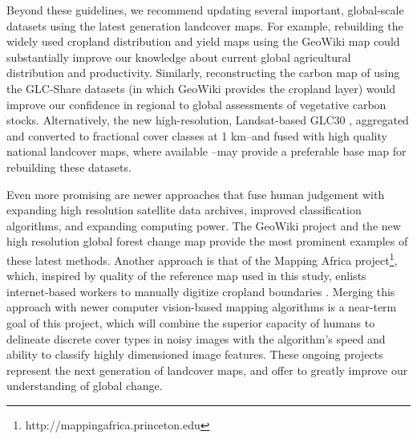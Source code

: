 \documentclass{pnastwo}
\begin{document}
\begin{article}
Beyond these guidelines, we recommend updating several important, global-scale datasets using the latest generation landcover maps. For example, rebuilding the widely used cropland distribution and yield maps \cite{monfreda_farming_2008, ramankutty_farming_2008} using the GeoWiki map could substantially improve our knowledge about current global agricultural distribution and productivity. Similarly, reconstructing the carbon map of \cite{ruesch_new_2008} using the GLC-Share datasets (in which GeoWiki provides the cropland layer) would improve our confidence in regional to global assessments of vegetative carbon stocks. Alternatively, the new high-resolution, Landsat-based GLC30 \cite{chen_global_2015}, aggregated and converted to fractional cover classes at 1 km--and fused with high quality national landcover maps, where available \cite[similar to][]{fritz_mapping_2015,fritz_cropland_2011}--may provide a preferable base map for rebuilding these datasets. 

Even more promising are newer approaches that fuse human judgement with expanding high resolution satellite data archives, improved classification algorithms, and expanding computing power. The GeoWiki project and the new high resolution global forest change map \cite{hansen_high-resolution_2013} provide the most prominent examples of these latest methods. Another approach is that of the Mapping Africa project\footnote{http://mappingafrica.princeton.edu}, which, inspired by quality of the reference map used in this study, enlists internet-based workers to manually digitize cropland boundaries \cite{estes_diylandcover:_2015}.  Merging this approach with newer computer vision-based mapping algorithms \cite{debats_generalized_????} is a near-term goal of this project, which will combine the superior capacity of humans to delineate discrete cover types in noisy images \cite{estes_diylandcover:_2015} with the algorithm's speed and ability to classify highly dimensioned image features. These ongoing projects represent the next generation of landcover maps, and offer to greatly improve our understanding of global change. 







\end{article}
\end{document}
